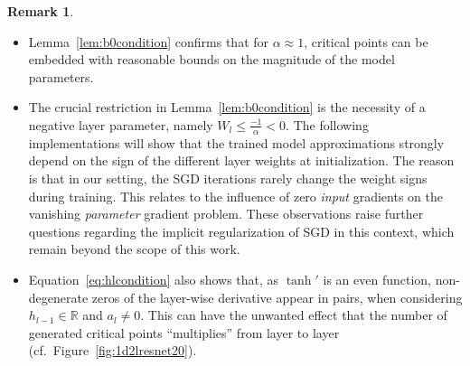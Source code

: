 \documentclass[10pt]{article}
\theoremstyle{definition}
\newtheorem{remark}[theorem]{Remark}
\numberwithin{equation}{section}
\newcommand{\R}{\mathbb{R}}
\begin{document}
\begin{remark}~\label{rem:tanheven}
   \begin{itemize}
       \item Lemma~\ref{lem:b0condition} confirms that for $\alpha \approx 1$, critical points can be embedded with reasonable bounds on the magnitude of the model parameters.
       
       \item The crucial restriction in Lemma~\ref{lem:b0condition} is the necessity of a negative layer parameter, namely $W_l \leq \frac{-1}{\alpha} < 0$. The following implementations will show that the trained model approximations strongly depend on the sign of the different layer weights at initialization. The reason is that in our setting, the SGD iterations rarely change the weight signs during training. This relates to the influence of zero \emph{input} gradients on the vanishing \emph{parameter} gradient problem. These observations raise further questions regarding the implicit regularization of SGD in this context, which remain beyond the scope of this work.

       \item Equation~\eqref{eq:hlcondition} also shows that, as $\tanh'$ is an even function, non-degenerate zeros of the layer-wise derivative appear in pairs, when considering $h_{l-1} \in \R$ and $a_l \neq 0$. This can have the unwanted effect that the number of generated critical points ``multiplies'' from layer to layer (cf.~Figure~\ref{fig:1d2lresnet20}).
   \end{itemize} 
\end{remark}
\end{document}
